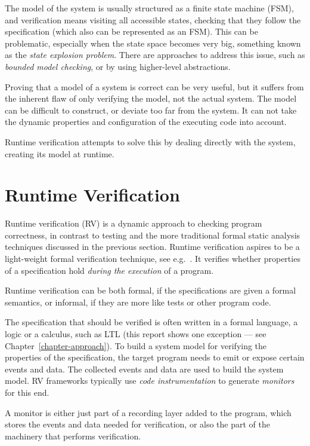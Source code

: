 \documentclass[a4paper,11pt]{kth-mag}
\theoremstyle{definition}
\begin{document}
The model of the system is usually structured as a finite state machine (FSM),
and verification means visiting all accessible states, checking that they
follow the specification (which also can be represented as an FSM). This can be
problematic, especially when the state space becomes very big, something known
as the \textit{state explosion problem}. There are approaches to address this
issue, such as \textit{bounded model checking}, or by using higher-level
abstractions.

Proving that a model of a system is correct can be very useful, but it suffers
from the inherent flaw of only verifying the model, not the actual system. The
model can be difficult to construct, or deviate too far from the system. It can
not take the dynamic properties and configuration of the executing code into
account.

Runtime verification attempts to solve this by dealing directly with the
system, creating its model at runtime.


\section{Runtime Verification} \label{section-rv}

Runtime verification (RV) is a dynamic approach to checking program
correctness, in contrast to testing and the more traditional formal static
analysis techniques discussed in the previous section. Runtime verification
aspires to be a light-weight formal verification technique, see e.g.\
\cite{leucker09abriefaccount,delgado04taxonomy}. It verifies whether properties
of a specification hold \textit{during the execution} of a program.

Runtime verification can be both formal, if the specifications are given a
formal semantics, or informal, if they are more like tests or other program
code.

The specification that should be verified is often written in a formal
language, a logic or a calculus, such as LTL \cite{pnueli77} (this report shows
one exception --- see Chapter~\ref{chapter-approach}). To build a system model
for verifying the properties of the specification, the target program needs to
emit or expose certain events and data. The collected events and data are used
to build the system model. RV frameworks typically use \textit{code
instrumentation} to generate \textit{monitors} for this end.

A monitor is either just part of a recording layer added to the program, which
stores the events and data needed for verification, or also the part of the
machinery that performs verification.
\end{document}
